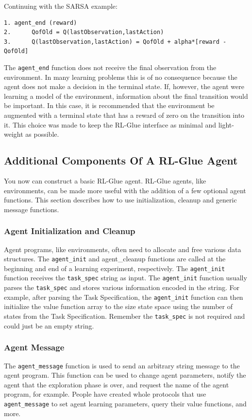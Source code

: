 \documentclass[11pt]{article}
\begin{document}
Continuing with the SARSA example:
\begin{verbatim}
1. agent_end (reward) 
2.      QofOld = Q(lastObservation,lastAction)
3.      Q(lastObservation,lastAction) = QofOld + alpha*[reward - QofOld]
\end{verbatim}


The \texttt{agent\_end} function does not receive the final observation from the environment. In many learning problems this is of no consequence because the agent does not make a decision in the terminal state. If, however, the agent were learning a model of the environment, information about the final transition would be important. In this case, it is recommended that the environment be augmented with a terminal state that has a reward of zero on the transition into it. This choice was made to keep the RL-Glue interface as minimal and light-weight as possible. 

\subsection{Additional Components Of A RL-Glue Agent}
\label{agentp2}
You now can construct a basic RL-Glue agent. RL-Glue agents, like environments, can be made more useful with the addition of a few optional agent functions. This section describes how to use initialization, cleanup and generic message functions.

\subsubsection{Agent Initialization and Cleanup}
Agent programs, like environments, often need to allocate and free various data structures. The \texttt{agent\_init}  and agent\_cleanup functions are called at the beginning and end of a learning experiment, respectively. The \texttt{agent\_init}  function receives the \texttt{task\_spec} string as input. The \texttt{agent\_init}  function usually parses the \texttt{task\_spec} and stores various information encoded in the string. For example, after parsing the Task Specification, the \texttt{agent\_init}  function can then initialize the value function array to the size state space using the number of states from the Task Specification. Remember the \texttt{task\_spec} is not required and could just be an empty string.      

\subsubsection{Agent Message}
The \texttt{agent\_message} function is used to send an arbitrary string message to the agent program. This function can be used to change agent parameters, notify the agent that the exploration phase is over, and request the name of the agent program, for example.  People have created whole protocols that use \texttt{agent\_message} to set agent learning parameters, query their value functions, and more.
\end{document}
